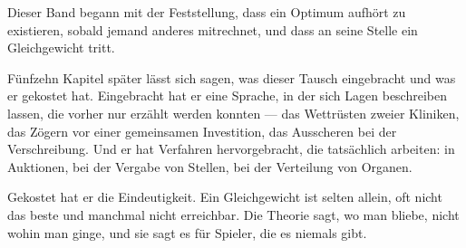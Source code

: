 \begin{merksatz}
\begin{center}
\begin{minipage}{0.9\textwidth}
Dieser Band begann mit der Feststellung, dass ein Optimum aufhört zu existieren, sobald jemand anderes mitrechnet, und dass an seine Stelle ein Gleichgewicht tritt.

Fünfzehn Kapitel später lässt sich sagen, was dieser Tausch eingebracht und was er gekostet hat. Eingebracht hat er eine Sprache, in der sich Lagen beschreiben lassen, die vorher nur erzählt werden konnten --- das Wettrüsten zweier Kliniken, das Zögern vor einer gemeinsamen Investition, das Ausscheren bei der Verschreibung. Und er hat Verfahren hervorgebracht, die tatsächlich arbeiten: in Auktionen, bei der Vergabe von Stellen, bei der Verteilung von Organen.

Gekostet hat er die Eindeutigkeit. Ein Gleichgewicht ist selten allein, oft nicht das beste und manchmal nicht erreichbar. Die Theorie sagt, wo man bliebe, nicht wohin man ginge, und sie sagt es für Spieler, die es niemals gibt.
\end{minipage}
\end{center}

\begin{center}
\begin{minipage}{0.88\textwidth}
\end{minipage}
\end{center}

\begin{center}
\begin{minipage}{0.88\textwidth}
\end{minipage}
\end{center}
\end{merksatz}
